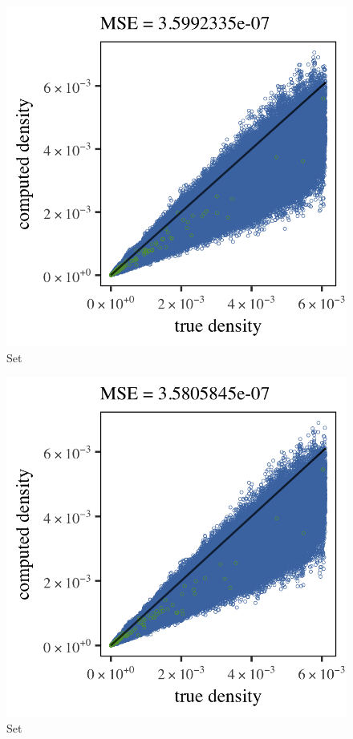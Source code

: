 \begin{subfigure}{0.3\textwidth}
	\centering
	\includegraphics[keepaspectratio=true, width=\textwidth, height=0.23\textheight]{4/img/results_baakman_4_600000_mbe_breiman}
	\caption{Set \baakmanFour}
	\label{fig:4:simulated:datasets:mbe:baakman4}
\end{subfigure}	
\begin{subfigure}{0.3\textwidth}
	\centering
	\includegraphics[keepaspectratio=true, width=\textwidth, height=0.23\textheight]{4/img/results_baakman_5_600000_mbe_breiman}
	\caption{Set \baakmanFive}
	\label{fig:4:simulated:datasets:mbe:baakman5}
\end{subfigure}		
